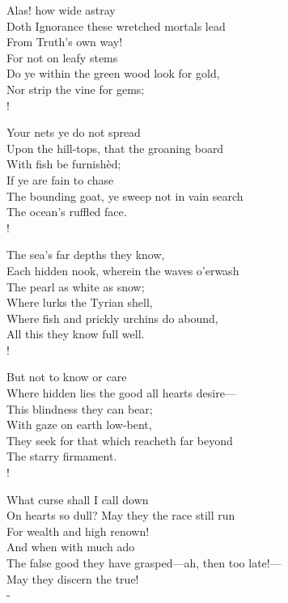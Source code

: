 \documentclass[12pt]{book}
\newenvironment{vpoem}[1]%
  {\def\poemvsindentlines{#1}\begin{poem}\small}%
  {\end{poem}\def\poemvsindentlines{\relax}}
\begin{document}
\begin{vpoem}{1346}
      Alas! how wide astray \\
    Doth Ignorance these wretched mortals lead \\
      From Truth's own way! \\
      For not on leafy stems \\
    Do ye within the green wood look for gold, \\
      Nor strip the vine for gems; \\!

      Your nets ye do not spread \\
    Upon the hill-tops, that the groaning board \\
      With fish be furnishèd; \\
      If ye are fain to chase \\
    The bounding goat, ye sweep not in vain search \\
      The ocean's ruffled face. \\!

      The sea's far depths they know, \\
    Each hidden nook, wherein the waves o'erwash \\
      The pearl as white as snow; \\
      Where lurks the Tyrian shell, \\
    Where fish and prickly urchins do abound, \\
      All this they know full well. \\!
 
      But not to know or care \\
    Where hidden lies the good all hearts desire--- \\
      This blindness they can bear; \\
      With gaze on earth low-bent, \\
    They seek for that which reacheth far beyond \\
      The starry firmament. \\!

      What curse shall I call down \\
    On hearts so dull? May they the race still run \\
      For wealth and high renown! \\
      And when with much ado \\
    The false good they have grasped---ah, then too late!--- \\
      May they discern the true! \\-
\end{vpoem}
\end{document}
